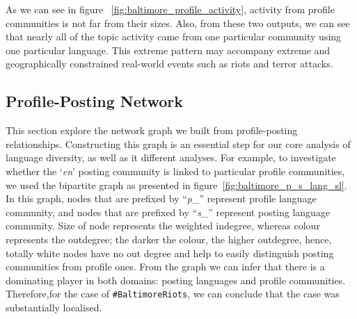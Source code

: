As we can see in figure ~\ref{fig:baltimore_profile_activity}, 
activity from profile communities is not far from their sizes.
Also, from these two outputs, we can see that nearly all of the topic
activity came from one particular community using one particular
language. This extreme pattern may accompany extreme and
geographically constrained real-world events such as riots and terror
attacks.

\subsection{Profile-Posting Network}

This section explore the network graph we built from profile-posting relationships.
Constructing this graph is an essential step for our core analysis of language 
diversity, as well as it different analyses. For example, to investigate whether 
the `{\emph{en}}' posting community is linked to particular profile communities, 
we used the bipartite graph as presented in figure~\ref{fig:baltimore_p_s_lang_sl}. 
In this graph, nodes that are prefixed by ``{\emph{p\_}}'' represent profile language 
community, and nodes that are prefixed by ``{\emph{s\_}}'' represent posting language
community. Size of node represents the weighted indegree, whereas colour
represents the outdegree; the darker the colour, the higher
outdegree, hence, totally white nodes have no out degree and help to easily 
distinguish posting communities from profile ones. From the graph 
we can infer that there is a dominating player in both domains: posting languages and profile communities.
Therefore,for the case of {\texttt{\#BaltimoreRiots}}, we can conclude that the case was
substantially localised.

